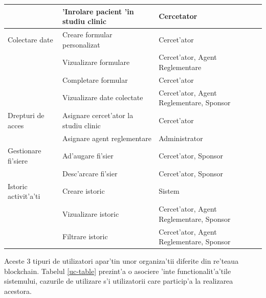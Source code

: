 \documentclass[12pt,a4paper,twoside]{report}
\begin{document}
\begin{table}[H]
\begin{tabular}{|p{5cm}|p{5.3cm}|p{5.1cm}|}
                         & 'Inrolare pacient 'in studiu clinic          & Cercetator                                             \\ \hline
Colectare date           & Creare formular personalizat               & Cercet'ator                                             \\ \cline{2-3} 
                         & Vizualizare formulare                      & Cercet'ator, Agent Reglementare                         \\ \cline{2-3} 
                         & Completare formular                        & Cercet'ator                                             \\ \cline{2-3} 
                         & Vizualizare date colectate                 & Cercet'ator, Agent Reglementare, Sponsor                \\ \hline
Drepturi de acces        & Asignare cercet'ator la studiu clinic       & Cercet'ator                                             \\ \cline{2-3} 
                         & Asignare agent reglementare                & Administrator                                          \\ \hline
Gestionare fi'siere       & Ad'augare fi'sier                            & Cercet'ator, Sponsor                                    \\ \cline{2-3} 
                         & Desc'arcare fi'sier                          & Cercet'ator, Sponsor                                    \\ \hline
Istoric activit'a'ti       & Creare istoric                             & Sistem                                                 \\ \cline{2-3} 
                         & Vizualizare istoric                        & Cercet'ator, Agent Reglementare, Sponsor                \\ \cline{2-3} 
                         & Filtrare istoric                           & Cercet'ator, Agent Reglementare, Sponsor                \\ \hline
\end{tabular}
\end{table}

 Aceste 3 tipuri de utilizatori apar'tin unor organiza'tii diferite din re'teaua blockchain. Tabelul \ref{uc-table} prezint'a o asociere 'inte functionalit'a'tile sistemului, cazurile de utilizare s'i utilizatorii care particip'a la realizarea acestora.
\end{document}
